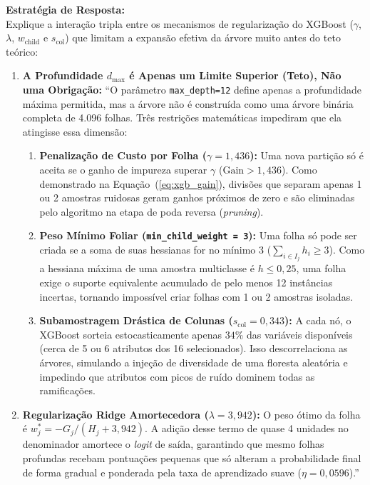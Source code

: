 \documentclass[11pt,a4paper]{article}
\begin{document}
\begin{boardAnswer}
\textbf{Estratégia de Resposta:}\\
Explique a interação tripla entre os mecanismos de regularização do XGBoost ($\gamma$, $\lambda$, $w_{\text{child}}$ e $s_{\text{col}}$) que limitam a expansão efetiva da árvore muito antes do teto teórico:

\begin{enumerate}[leftmargin=0.8cm]
  \item \textbf{A Profundidade $d_{\max}$ é Apenas um Limite Superior (Teto), Não uma Obrigação:} ``O parâmetro \texttt{max\_depth=12} define apenas a profundidade máxima permitida, mas a árvore não é construída como uma árvore binária completa de 4.096 folhas. Três restrições matemáticas impediram que ela atingisse essa dimensão:
  \begin{enumerate}
    \item \textbf{Penalização de Custo por Folha ($\gamma = 1{,}436$):} Uma nova partição só é aceita se o ganho de impureza superar $\gamma$ ($\text{Gain} > 1{,}436$). Como demonstrado na Equação~(\ref{eq:xgb_gain}), divisões que separam apenas 1 ou 2 amostras ruidosas geram ganhos próximos de zero e são eliminadas pelo algoritmo na etapa de poda reversa (\textit{pruning}).
    \item \textbf{Peso Mínimo Foliar (\texttt{min\_child\_weight = 3}):} Uma folha só pode ser criada se a soma de suas hessianas for no mínimo 3 ($\sum_{i \in I_j} h_i \ge 3$). Como a hessiana máxima de uma amostra multiclasse é $h \le 0{,}25$, uma folha exige o suporte equivalente acumulado de pelo menos 12 instâncias incertas, tornando impossível criar folhas com 1 ou 2 amostras isoladas.
    \item \textbf{Subamostragem Drástica de Colunas ($s_{\text{col}} = 0{,}343$):} A cada nó, o XGBoost sorteia estocasticamente apenas $34\%$ das variáveis disponíveis (cerca de 5 ou 6 atributos dos 16 selecionados). Isso descorrelaciona as árvores, simulando a injeção de diversidade de uma floresta aleatória e impedindo que atributos com picos de ruído dominem todas as ramificações.
  \end{enumerate}
  \item \textbf{Regularização Ridge Amortecedora ($\lambda = 3{,}942$):} O peso ótimo da folha é $w_j^* = -G_j / (H_j + 3{,}942)$. A adição desse termo de quase 4 unidades no denominador amortece o \textit{logit} de saída, garantindo que mesmo folhas profundas recebam pontuações pequenas que só alteram a probabilidade final de forma gradual e ponderada pela taxa de aprendizado suave ($\eta = 0{,}0596$).''
\end{enumerate}
\end{boardAnswer}
\end{document}
